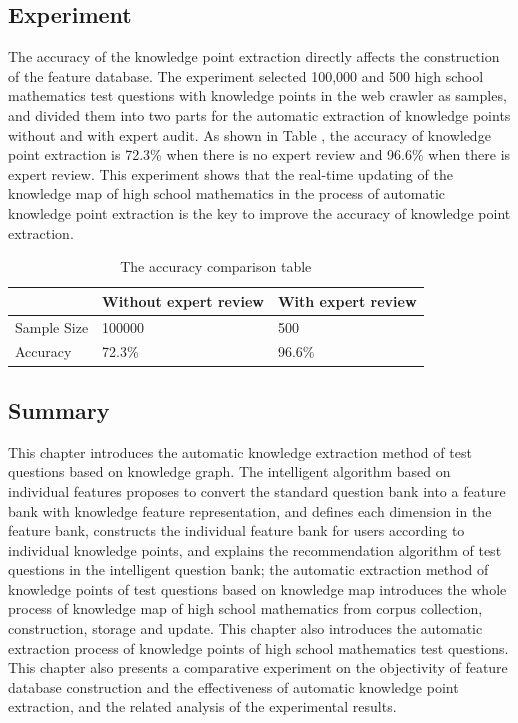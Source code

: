 \documentclass[11pt,en]{elegantpaper}
\begin{document}
\subsection{Experiment}
The accuracy of the knowledge point extraction directly affects the construction of the feature database. The experiment selected 100,000 and 500 high school mathematics test questions with knowledge points in the web crawler as samples, and divided them into two parts for the automatic extraction of knowledge points without and with expert audit. As shown in Table , the accuracy of knowledge point extraction is 72.3\% when there is no expert review and 96.6\% when there is expert review. This experiment shows that the real-time updating of the knowledge map of high school mathematics in the process of automatic knowledge point extraction is the key to improve the accuracy of knowledge point extraction.

\begin{table}[h]
	\centering

	\begin{tabular}{|l|l|l|}
	\hline
				& Without expert review & With expert review \\ \hline
	Sample Size & 100000                & 500                \\ \hline
	Accuracy    & 72.3\%                & 96.6\%             \\ \hline
	\end{tabular}
	\caption{The accuracy comparison table}
\end{table}

\subsection{Summary}
This chapter introduces the automatic knowledge extraction method of test questions based on knowledge graph. The intelligent algorithm based on individual features proposes to convert the standard question bank into a feature bank with knowledge feature representation, and defines each dimension in the feature bank, constructs the individual feature bank for users according to individual knowledge points, and explains the recommendation algorithm of test questions in the intelligent question bank; the automatic extraction method of knowledge points of test questions based on knowledge map introduces the whole process of knowledge map of high school mathematics from corpus collection, construction, storage and update. This chapter also introduces the automatic extraction process of knowledge points of high school mathematics test questions. This chapter also presents a comparative experiment on the objectivity of feature database construction and the effectiveness of automatic knowledge point extraction, and the related analysis of the experimental results.
\end{document}
